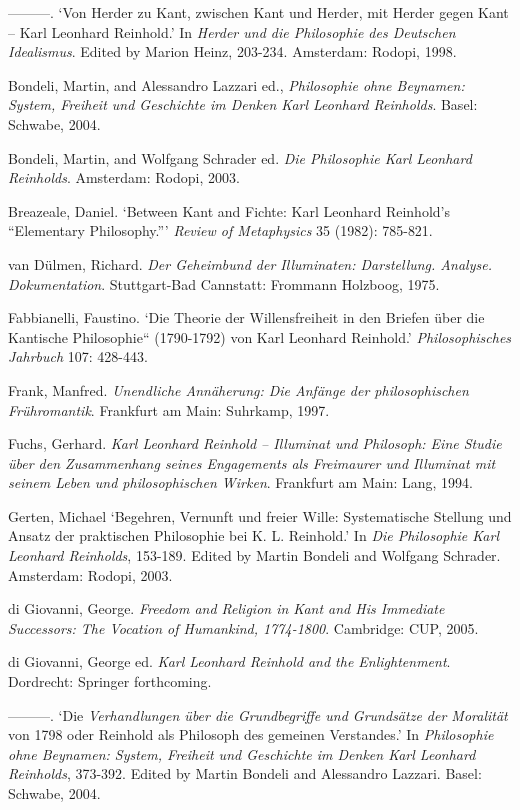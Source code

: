 {---}{---}{---}. `Von Herder zu Kant, zwischen Kant und Herder, mit Herder gegen Kant {--} Karl Leonhard Reinhold.' In \textit{Herder und die Philosophie des Deutschen Idealismus}. Edited by Marion Heinz, 203{-}234. Amsterdam: Rodopi, 1998.

Bondeli, Martin, and Alessandro Lazzari ed., \textit{Philosophie ohne Beynamen: System, Freiheit und Geschichte im Denken Karl Leonhard Reinholds}. Basel: Schwabe, 2004.

Bondeli, Martin, and Wolfgang Schrader ed. \textit{Die Philosophie Karl Leonhard Reinholds}. Amsterdam: Rodopi, 2003.

Breazeale, Daniel. `Between Kant and Fichte: Karl Leonhard Reinhold's ``Elementary Philosophy.''' \textit{Review of Metaphysics} 35 (1982): 785{-}821.

van D\"{u}lmen, Richard. \textit{Der Geheimbund der Illuminaten: Darstellung. Analyse. Dokumentation}. Stuttgart{-}Bad Cannstatt: Frommann Holzboog, 1975.

Fabbianelli, Faustino. `Die Theorie der Willensfreiheit in den \quotedblbase Briefen \"{u}ber die Kantische Philosophie`` (1790{-}1792) von Karl Leonhard Reinhold.' \textit{Philosophisches Jahrbuch} 107: 428{-}443. 

Frank, Manfred. \textit{Unendliche Ann\"{a}herung: Die Anf\"{a}nge der philosophischen Fr\"{u}hromantik}. Frankfurt am Main: Suhrkamp, 1997.

Fuchs, Gerhard.\textit{ Karl Leonhard Reinhold {--} Illuminat und Philosoph: Eine Studie \"{u}ber den Zusammenhang seines Engagements als Freimaurer und Illuminat mit seinem Leben und philosophischen Wirken}. Frankfurt am Main: Lang, 1994.

Gerten, Michael `Begehren, Vernunft und freier Wille: Systematische Stellung und Ansatz der praktischen Philosophie bei K. L. Reinhold.' In \textit{Die Philosophie Karl Leonhard Reinholds}, 153{-}189. Edited by Martin Bondeli and Wolfgang Schrader. Amsterdam: Rodopi, 2003. 

di Giovanni, George.\textit{ Freedom and Religion in Kant and His Immediate Successors: The Vocation of Humankind, 1774{-}1800}. Cambridge: CUP, 2005.

di Giovanni, George ed. \textit{Karl Leonhard Reinhold and the Enlightenment}. Dordrecht: Springer forthcoming.

{---}{---}{---}. `Die \textit{Verhandlungen \"{u}ber die Grundbegriffe und Grunds\"{a}tze der Moralit\"{a}t} von 1798 oder Reinhold als Philosoph des gemeinen Verstandes.' In \textit{Philosophie ohne Beynamen: System, Freiheit und Geschichte im Denken Karl Leonhard Reinholds}, 373{-}392. Edited by Martin Bondeli and Alessandro Lazzari. Basel: Schwabe, 2004.

